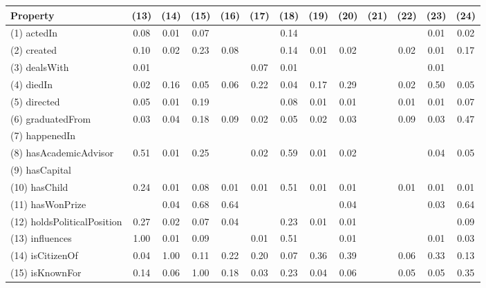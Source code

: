 \begin{table}[t]
\begin{center}
\begin{tabular}{|l||*{12}{c}|}
        \end{tabular}
        \begin{tabular}{|l||*{12}{c}|}
            \hline
            Property & (13) & (14) & (15) & (16) & (17) & (18) & (19) & (20) & (21) & (22) & (23) & (24) \\
            \hline
            (1) actedIn  & 0.08  & 0.01  & 0.07  &    &    & 0.14  &    &    &    &    & 0.01  & 0.02 \\
            (2) created  & 0.10  & 0.02  & 0.23  & 0.08  &    & 0.14  & 0.01  & 0.02  &    & 0.02  & 0.01  & 0.17 \\
            (3) dealsWith  & 0.01  &    &    &    & 0.07  & 0.01  &    &    &    &    & 0.01  &   \\
            (4) diedIn  & 0.02  & 0.16  & 0.05  & 0.06  & 0.22  & 0.04  & 0.17  & 0.29  &    & 0.02  & 0.50  & 0.05 \\
            (5) directed  & 0.05  & 0.01  & 0.19  &    &    & 0.08  & 0.01  & 0.01  &    & 0.01  & 0.01  & 0.07 \\
            (6) graduatedFrom  & 0.03  & 0.04  & 0.18  & 0.09  & 0.02  & 0.05  & 0.02  & 0.03  &    & 0.09  & 0.03  & 0.47 \\
            (7) happenedIn  &    &    &    &    &    &    &    &    &    &    &    &   \\
            (8) hasAcademicAdvisor  & 0.51  & 0.01  & 0.25  &    & 0.02  & 0.59  & 0.01  & 0.02  &    &    & 0.04  & 0.05 \\
            (9) hasCapital  &    &    &    &    &    &    &    &    &    &    &    &   \\
            (10) hasChild  & 0.24  & 0.01  & 0.08  & 0.01  & 0.01  & 0.51  & 0.01  & 0.01  &    & 0.01  & 0.01  & 0.01 \\
            (11) hasWonPrize  &    & 0.04  & 0.68  & 0.64  &    &    &    & 0.04  &    &    & 0.03  & 0.64 \\
            (12) holdsPoliticalPosition  & 0.27  & 0.02  & 0.07  & 0.04  &    & 0.23  & 0.01  & 0.01  &    &    &    & 0.09 \\
            (13) influences  & 1.00  & 0.01  & 0.09  &    & 0.01  & 0.51  &    & 0.01  &    &    & 0.01  & 0.03 \\
            (14) isCitizenOf  & 0.04  & 1.00  & 0.11  & 0.22  & 0.20  & 0.07  & 0.36  & 0.39  &    & 0.06  & 0.33  & 0.13 \\
            (15) isKnownFor  & 0.14  & 0.06  & 1.00  & 0.18  & 0.03  & 0.23  & 0.04  & 0.06  &    & 0.05  & 0.05  & 0.35 \\

\end{tabular}
\end{center}
\end{table}
